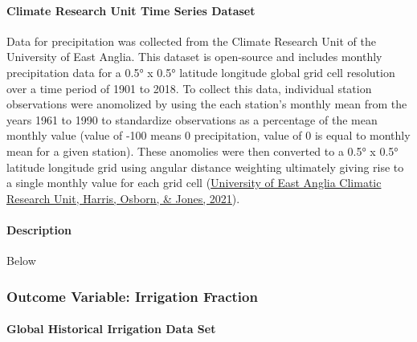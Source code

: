 \documentclass[12pt,twoside]{reedthesis}
\begin{document}
\hypertarget{CRU}{%
\paragraph{Climate Research Unit Time Series Dataset}\label{CRU}}

Data for precipitation was collected from the Climate Research Unit of the University of East Anglia. This dataset is open-source and includes monthly precipitation data for a 0.5° x 0.5° latitude longitude global grid cell resolution over a time period of 1901 to 2018. To collect this data, individual station observations were anomolized by using the each station's monthly mean from the years 1961 to 1990 to standardize observations as a percentage of the mean monthly value (value of -100 means 0 precipitation, value of 0 is equal to monthly mean for a given station). These anomolies were then converted to a 0.5° x 0.5° latitude longitude grid using angular distance weighting ultimately giving rise to a single monthly value for each grid cell (\protect\hyperlink{ref-universityofeastangliaclimaticresearchunitVersionCRUTS2021}{University of East Anglia Climatic Research Unit, Harris, Osborn, \& Jones, 2021}).

\hypertarget{precipdesc}{%
\paragraph{Description}\label{precipdesc}}

Below

\hypertarget{irrfrac}{%
\subsubsection{Outcome Variable: Irrigation Fraction}\label{irrfrac}}

\hypertarget{HID}{%
\paragraph{Global Historical Irrigation Data Set}\label{HID}}
\end{document}
